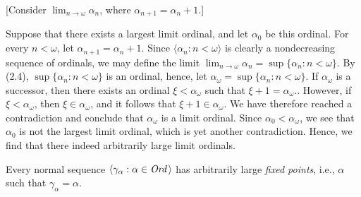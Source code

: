 [Consider $\lim_{n \rightarrow \omega} \alpha_n$, where 
$\alpha_{n+1} = \alpha_n + 1$.]
\begin{solution}
Suppose that there exists a largest limit ordinal, and let $\alpha_0$ be this 
ordinal. For every $n < \omega$, let $\alpha_{n+1} = \alpha_n + 1$. Since 
$\langle \alpha_n : n < \omega \rangle$ is clearly a nondecreasing sequence of 
ordinals, we may define the limit 
$\lim_{n \rightarrow \omega} \alpha_n = \sup \{ \alpha_n : n < \omega \}$. By 
(2.4), $\sup \{ \alpha_n : n < \omega \}$ is an ordinal, hence, let 
$\alpha_{\omega} = \sup \{ \alpha_n : n < \omega \}$. If $\alpha_{\omega}$ is 
a successor, then there exists an ordinal $\xi < \alpha_{\omega}$ such that 
$\xi + 1 = \alpha_{\omega}$.. However, if $\xi < \alpha_{\omega}$, then 
$\xi \in \alpha_{\omega}$, and it follows that $\xi + 1 \in \alpha_{\omega}$. 
We have therefore reached a contradiction and conclude that $\alpha_{\omega}$ 
is a limit ordinal. Since $\alpha_0 < \alpha_{\omega}$, we see that $\alpha_0$ 
is not the largest limit ordinal, which is yet another contradiction. Hence, we
find that there indeed arbitrarily large limit ordinals.
\end{solution}

 Every normal sequence 
$\langle \gamma_{\alpha} : \alpha \in \textit{Ord\,} \rangle$ has arbitrarily large 
\textit{fixed points}, i.e., $\alpha$ such that $\gamma_{\alpha} = \alpha$.

